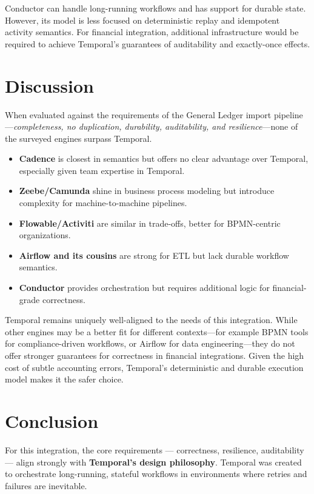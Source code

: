 \documentclass[11pt, a4paper, twocolumn]{article} %
\begin{document}
Conductor can handle long-running workflows and has support for durable state. However, its model is less focused on deterministic replay and idempotent activity semantics. For financial integration, additional infrastructure would be required to achieve Temporal's guarantees of auditability and exactly-once effects.

\newpage

\section*{Discussion}

When evaluated against the requirements of the General Ledger import pipeline---\textit{completeness, no duplication, durability, auditability, and resilience}---none of the surveyed engines surpass Temporal.

\begin{itemize}
  \item \textbf{Cadence} is closest in semantics but offers no clear 
  advantage over Temporal, especially given team expertise in Temporal.
  \item \textbf{Zeebe/Camunda} shine in business process modeling but 
  introduce complexity for machine-to-machine pipelines.
  \item \textbf{Flowable/Activiti} are similar in trade-offs, better for 
  BPMN-centric organizations.
  \item \textbf{Airflow and its cousins} are strong for ETL but lack 
  durable workflow semantics.
  \item \textbf{Conductor} provides orchestration but requires additional 
  logic for financial-grade correctness.
\end{itemize}

Temporal remains uniquely well-aligned to the needs of this integration. While other engines may be a better fit for different contexts---for example BPMN tools for compliance-driven workflows, or Airflow for data engineering---they do not offer stronger guarantees for correctness in financial integrations. Given the high cost of subtle accounting errors, Temporal's deterministic and durable execution model makes it the safer choice.

\newpage

\section*{Conclusion}

For this integration, the core requirements — correctness, resilience, auditability — align strongly with \textbf{Temporal’s design philosophy}. Temporal was created to orchestrate long-running, stateful workflows in environments where retries and failures are inevitable.
\end{document}
